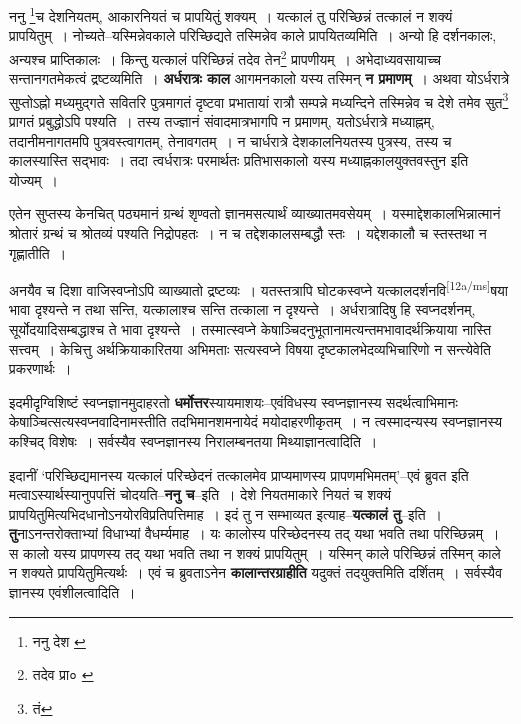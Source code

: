 \documentclass[article,12pt,a4paper]{memoir}
\begin{document}
	ननु \footnote{ननु देश \cite{dp-msA} \cite{dp-edP} \cite{dp-edE}}च देशनियतम्, आकारनियतं च प्रापयितुं शक्यम् । यत्कालं तु परिच्छिन्नं तत्कालं न शक्यं प्रापयितुम् । नोच्यते--यस्मिन्नेवकाले परिच्छिद्यते तस्मिन्नेव काले प्रापयितव्यमिति । अन्यो हि दर्शनकालः, अन्यश्च प्राप्तिकालः । किन्तु यत्कालं परिच्छिन्नं तदेव तेन\footnote{तदेव प्रा० \cite{dp-msD} \cite{dp-msA} \cite{dp-edP} \cite{dp-edE}} प्रापणीयम् । अभेदाध्यवसायाच्च सन्तानगतमेकत्वं द्रष्टव्यमिति । \textbf{अर्धरात्रः काल} आगमनकालो यस्य तस्मिन् \textbf{न प्रमाणम्} । अथवा योऽर्धरात्रे सुप्तोऽह्नो मध्यमुद्गते सवितरि पुत्रमागतं दृष्टवा प्रभातायां रात्रौ सम्पन्ने मध्यन्दिने तस्मिन्नेव च देशे तमेव सुत\footnote{तं} प्रागतं प्रबुद्धोऽपि पश्यति । तस्य तज्ज्ञानं संवादमात्रभागपि न प्रमाणम्, यतोऽर्धरात्रे मध्याह्नम्, तदानीमनागतमपि पुत्रवस्त्वागतम्, तेनावगतम् । न चार्धरात्रे देशकालनियतस्य पुत्रस्य, तस्य च कालस्यास्ति सद्भावः । तदा त्वर्धरात्रः परमार्थतः प्रतिभासकालो यस्य मध्याह्नकालयुक्तवस्तुन इति योज्यम् ।
	\pend
      

	  \pstart एतेन सुप्तस्य केनचित् पठ्यमानं ग्रन्थं शृण्वतो ज्ञानमसत्यार्थं व्याख्यातमवसेयम् । यस्माद्देशकालभिन्नात्मानं श्रोतारं ग्रन्थं च श्रोतव्यं पश्यति निद्रोपहतः । न च तद्देशकालसम्बद्धौ स्तः । यद्देशकालौ च स्तस्तथा न गृह्णातीति ।
	\pend
      

	  \pstart अनयैव च दिशा वाजिस्वप्नोऽपि व्याख्यातो द्रष्टव्यः । यतस्तत्रापि घोटकस्वप्ने यत्कालदर्शनवि\leavevmode\textsuperscript{\rmlatinfont\tiny [12a/ms]}षया भावा दृश्यन्ते न तथा सन्ति, यत्कालाश्च सन्ति तत्काला न दृश्यन्ते । अर्धरात्रादिषु हि स्वप्नदर्शनम्, सूर्योदयादिसम्बद्धाश्च ते भावा दृश्यन्ते । तस्मात्स्वप्ने केषाञ्चिदनुभूतानामत्यन्तमभावादर्थक्रियाया नास्ति सत्त्वम् । केचित्तु अर्थक्रियाकारितया अभिमताः सत्यस्वप्ने विषया दृष्टकालभेदव्यभिचारिणो न सन्त्येवेति प्रकरणार्थः ।
	\pend
      

	  \pstart इदमीदृग्विशिष्टं स्वप्नज्ञानमुदाहरतो \textbf{धर्मोत्तर}स्यायमाशयः--एवंविधस्य स्वप्नज्ञानस्य सदर्थत्वाभिमानः केषाञ्चित्सत्यस्वप्नवादिनामस्तीति तदभिमानशमनायेदं मयोदाहरणीकृतम् । न त्वस्मादन्यस्य स्वप्नज्ञानस्य कश्चिद् विशेषः । सर्वस्यैव स्वप्नज्ञानस्य निरालम्बनतया मिथ्याज्ञानत्वादिति ।
	\pend
      

	  \pstart इदानीं ‘परिच्छिद्यमानस्य यत्कालं परिच्छेदनं तत्कालमेव प्राप्यमाणस्य प्रापणमभिमतम्’--एवं ब्रुवत इति मत्वाऽस्यार्थस्यानुपपत्तिं चोदयति--\textbf{ननु च}--इति । देशे नियतमाकारे नियतं च शक्यं प्रापयितुमित्यभिदधानोऽनयोरविप्रतिपत्तिमाह । इदं तु न सम्भाव्यत इत्याह--\textbf{यत्कालं तु}--इति । \textbf{तु}नाऽनन्तरोक्ताभ्यां विधाभ्यां वैधर्म्यमाह । यः कालोस्य परिच्छेदनस्य तद् यथा भवति तथा परिच्छिन्नम् । स कालो यस्य प्रापणस्य तद् यथा भवति तथा न शक्यं प्रापयितुम् । यस्मिन् काले परिच्छिन्नं तस्मिन् काले न शक्यते प्रापयितुमित्यर्थः । एवं च ब्रुवताऽनेन \textbf{कालान्तरग्राहीति} यदुक्तं तदयुक्तमिति दर्शितम् । सर्वस्यैव ज्ञानस्य एवंशीलत्वादिति ।
	\pend
      
\end{document}

